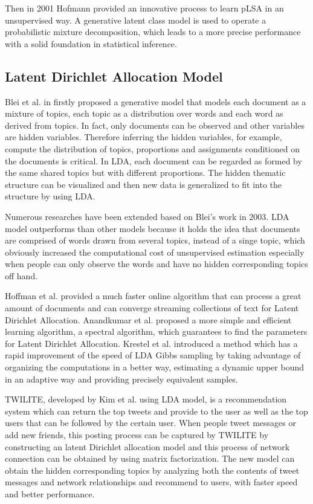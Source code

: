 Then in 2001 Hofmann \cite{hofmann2001unsupervised} provided an innovative process to learn pLSA in an unsupervised way. A generative latent class model is used  to operate a probabilistic mixture decomposition, which leads to a more precise performance with a solid foundation in statistical inference. 

\subsection{Latent Dirichlet Allocation Model}\label{lda}

Blei et al. in \cite{blei2003latent} firstly proposed a generative model that models each document as a mixture of topics, each topic as a distribution over words and each word as derived from topics. In fact, only documents can be observed and other variables are hidden variables. Therefore inferring the hidden variables, for example, compute the distribution of topics, proportions and assignments conditioned on the documents is critical. In LDA, each document can be regarded as formed by the same shared topics but with different proportions. The hidden thematic structure can be visualized and then new data is generalized to fit into the structure by using LDA. 

Numerous researches have been extended based on Blei's work in 2003. LDA \cite{blei2003latent} model outperforms than other models because it holds the idea that documents are comprised of words drawn from several topics, instead of a singe topic, which obviously increased the computational cost of unsupervised estimation especially when people can only observe the words and have no hidden corresponding topics off hand. 

Hoffman et al. \cite{hoffman2010online} provided a much faster online algorithm that can process a great amount of documents and can converge streaming collections of text for Latent Dirichlet Allocation. Anandkumar et al. \cite{anandkumar2012spectral} proposed a more simple and efficient learning algorithm, a spectral algorithm, which guarantees to find the parameters for Latent Dirichlet Allocation. Krestel et al. \cite{krestel2009latent} introduced a method which has a rapid improvement of the speed of LDA Gibbs sampling by taking advantage of organizing the computations in a better way, estimating a dynamic upper bound in an adaptive way and providing precisely equivalent samples.

TWILITE, developed by Kim et al. \cite{kim2014twilite} using LDA model, is a recommendation system which can return the top tweets and provide to the user as well as the top users that can be followed by the certain user. When people tweet messages or add new friends, this posting process can be captured by TWILITE by constructing an latent Dirichlet allocation model and this process of network connection can be obtained by using matrix factorization. The new model can obtain the hidden corresponding topics  by analyzing both the contents of tweet messages and network relationships  and recommend to users, with faster speed and better performance.

